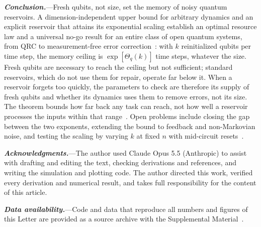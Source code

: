\documentclass[aps,prl,twocolumn,superscriptaddress,floatfix]{revtex4-2}
\theoremstyle{plain}
\newcommand{\runin}[1]{\textit{\textbf{#1}}---}
\begin{document}
\runin{Conclusion.}Fresh qubits, not size, set the memory of noisy quantum reservoirs. A dimension-independent upper bound for arbitrary dynamics and an explicit reservoir that attains its exponential scaling establish an optimal resource law and a universal no-go result for an entire class of open quantum systems, from QRC to measurement-free error correction~\cite{Heussen2024}: with $k$ reinitialized qubits per time step, the memory ceiling is $\exp[\Theta_q(k)]$ time steps, whatever the size. Fresh qubits are necessary to reach the ceiling but not sufficient; standard reservoirs, which do not use them for repair, operate far below it. When a reservoir forgets too quickly, the parameters to check are therefore its supply of fresh qubits and whether its dynamics uses them to remove errors, not its size. The theorem bounds how far back any task can reach, not how well a reservoir processes the inputs within that range~\cite{Cao2026}. Open problems include closing the gap between the two exponents, extending the bound to feedback and non-Markovian noise, and testing the scaling by varying $k$ at fixed $n$ with mid-circuit resets~\cite{Yasuda2023,Hu2024}.

\begin{acknowledgments}
\runin{Acknowledgments.}The author used Claude Opus 5.5 (Anthropic) to assist with drafting and editing the text, checking derivations and references, and writing the simulation and plotting code. The author directed this work, verified every derivation and numerical result, and takes full responsibility for the content of this article.
\end{acknowledgments}

\runin{Data availability.}Code and data that reproduce all numbers and figures of this Letter are provided as a source archive with the Supplemental Material~\cite{SM}.

\nocite{vonNeumann1956,Nelson2026,Xiong2025}


\clearpage
\onecolumngrid
\setcounter{equation}{0}
\setcounter{figure}{0}
\setcounter{table}{0}
\setcounter{section}{0}
\setcounter{lemma}{0}
\setcounter{page}{1}
\renewcommand{\theequation}{S\arabic{equation}}
\renewcommand{\thefigure}{S\arabic{figure}}
\renewcommand{\thetable}{S\arabic{table}}
\renewcommand{\thelemma}{S\arabic{lemma}}
\renewcommand{\thepage}{S\arabic{page}}
\setcounter{secnumdepth}{3}
\end{document}
